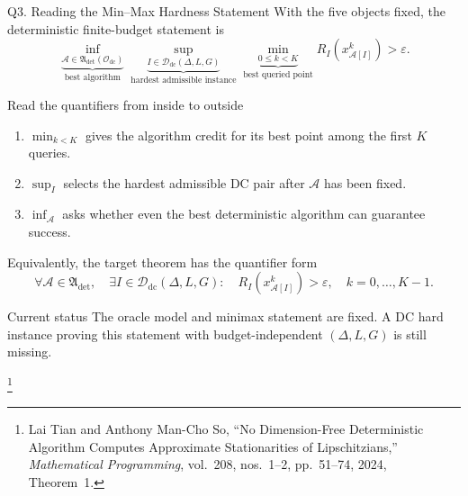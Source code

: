 \documentclass[10pt]{beamer}
\begin{document}
\begin{frame}{Q3. Reading the Min--Max Hardness Statement}
\footnotesize
With the five objects fixed, the deterministic finite-budget statement is
\[
\underbrace{\inf_{\mathcal A\in\mathfrak A_{\mathrm{det}}(\mathcal O_{\mathrm{dc}})}}_
{\text{best algorithm}}
\underbrace{\sup_{I\in\mathcal D_{\mathrm{dc}}(\Delta,L,G)}}_
{\text{hardest admissible instance}}
\underbrace{\min_{0\le k<K}}_{\text{best queried point}}
R_I\!\left(x_{\mathcal A[I]}^k\right)
>\varepsilon.
\]

\begin{block}{Read the quantifiers from inside to outside}
\begin{enumerate}\setlength{\itemsep}{3pt}
    \item $\min_{k<K}$ gives the algorithm credit for its best point among
    the first $K$ queries.
    \item $\sup_I$ selects the hardest admissible DC pair after
    $\mathcal A$ has been fixed.
    \item $\inf_{\mathcal A}$ asks whether even the best deterministic
    algorithm can guarantee success.
\end{enumerate}
\end{block}

Equivalently, the target theorem has the quantifier form
\[
\forall\mathcal A\in\mathfrak A_{\mathrm{det}},\quad
\exists I\in\mathcal D_{\mathrm{dc}}(\Delta,L,G):\quad
R_I\!\left(x_{\mathcal A[I]}^k\right)>\varepsilon,
\quad k=0,\ldots,K-1.
\]

\begin{alertblock}{Current status}
The oracle model and minimax statement are fixed. A DC hard instance proving
this statement with budget-independent $(\Delta,L,G)$ is still missing.
\end{alertblock}
\footnote{\footnotesize Lai Tian and Anthony Man-Cho So,
``No Dimension-Free Deterministic Algorithm Computes Approximate
Stationarities of Lipschitzians,'' \emph{Mathematical Programming},
vol.~208, nos.~1--2, pp.~51--74, 2024, Theorem~1.}
\end{frame}
\end{document}
